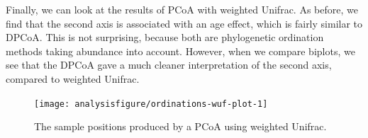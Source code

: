 Finally, we can look at the results of PCoA with weighted Unifrac. As
before, we find that the second axis is associated with an age effect,
which is fairly similar to DPCoA. This is not surprising, because both
are phylogenetic ordination methods taking abundance into
account. However, when we compare biplots, we see that the DPCoA
gave a much cleaner interpretation of the second axis, compared to
weighted Unifrac.

\begin{knitrout}
\color{fgcolor}\begin{kframe}
\begin{alltt}
 \hlkwb{<-}   \hlstd{=} \hlstd{,}  \hlstd{=}\hlstd{)}
\end{alltt}
\end{kframe}
\end{knitrout}

\begin{figure}
\begin{knitrout}
\color{fgcolor}\begin{kframe}
\begin{alltt}
 \hlkwb{<-} \hlopt{$}\hlopt{$}
  \hlstd{=} \hlstd{,}
                 \hlstd{=} \hlstd{)} \hlopt{+}
  \hlstd{(}\hlstd{(evals[}\hlstd{]} \hlopt{/} \hlstd{evals[}\hlstd{]))} \hlopt{+}
  \hlstd{(} \hlstd{=} \hlstd{,}  \hlstd{=} \hlstd{)}
\end{alltt}
\end{kframe}

{\centering \texttt{[image: analysisfigure/ordinations-wuf-plot-1]} 

}



\end{knitrout}
\caption{The sample positions produced by a PCoA using weighted
  Unifrac.}
\label{fig:ordinations-wuf}
\end{figure}

